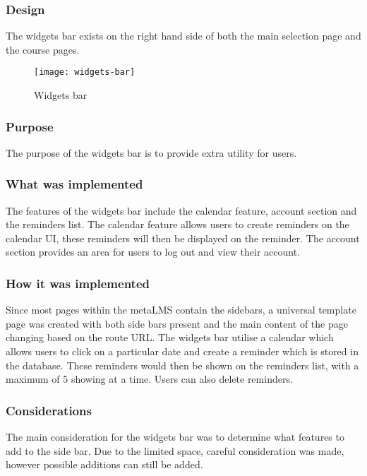 \subsubsection{Design}
The widgets bar exists on the right hand side of both the main selection page and the course pages.
\begin{figure}[h!]
    \centering
    \texttt{[image: widgets-bar]}
    \caption{Widgets bar}
\end{figure}
\subsubsection{Purpose}
The purpose of the widgets bar is to provide extra utility for users. 
\subsubsection{What was implemented}
The features of the widgets bar include the calendar feature, account section and the reminders list. The calendar feature allows users to create reminders on the calendar UI, these reminders will then be displayed on the reminder. The account section provides an area for users to log out and view their account.
\subsubsection{How it was implemented}
Since most pages within the metaLMS contain the sidebars, a universal template page was created with both side bars present and the main content of the page changing based on the route URL.
The widgets bar utilise a calendar which allows users to click on a particular date and create a reminder which is stored in the database. These reminders would then be shown on the reminders list, with a maximum of 5 showing at a time.
Users can also delete reminders.
\subsubsection{Considerations}
The main consideration for the widgets bar was to determine what features to add to the side bar. Due to the limited space, careful consideration was made, however possible additions can still be added.